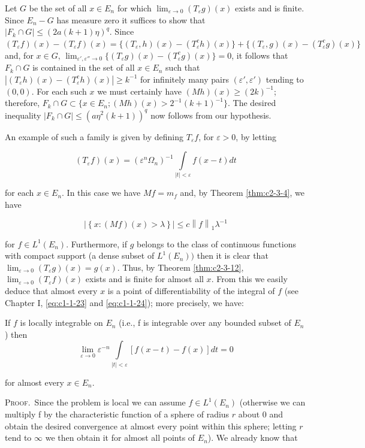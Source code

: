 Let $G$ be the set of all $x \in E_n$ for which $\lim_{\varepsilon \to 0} (T_\varepsilon g)(x)$ exists and is finite. Since $E_n - G$ has measure zero it suffices to show that $|F_k \cap G| \leq (2a(k + 1)\eta)^q$. Since $(T_\varepsilon f)(x) - (T_\varepsilon f)(x) = \{(T_\varepsilon, h)(x) - (T_\varepsilon^c h)(x)\} + \{(T_\varepsilon, g)(x) - (T_\varepsilon^c g)(x)\}$ and, for $x \in G$, $\lim_{\varepsilon', \varepsilon'' \to 0} \{(T_\varepsilon g)(x) - (T_\varepsilon^c g)(x)\} = 0$, it follows that $F_k \cap G$ is contained in the set of all $x \in E_n$ such that $|(T_\varepsilon h)(x) - (T_\varepsilon^c h)(x)| \geq k^{-1}$ for infinitely many pairs $(\varepsilon', \varepsilon')$ tending to $(0, 0)$. For each such $x$ we must certainly have $(Mh)(x) \geq (2k)^{-1}$; therefore, $F_k \cap G \subset \{x \in E_n; (Mh)(x) > 2^{-1}(k + 1)^{-1}\}$. The desired inequality $|F_k \cap G| \leq (a\eta^2(k + 1))^q$ now follows from our hypothesis.

An example of such a family is given by defining $T_{\varepsilon}f$, for $\varepsilon>0$, by letting

\[
(T_{\varepsilon}f)(x)=(\varepsilon^{n}\Omega_{n})^{-1}\int\limits_{|t|<\varepsilon}f(x-t)d t
\]

for each $x \in E_n$. In this case we have $Mf = m_f$ and, by Theorem \ref{thm:c2-3-4}, we have

\[
\left|\left\{x:\left(M f\right)(x)>\lambda\right\}\right|\leq c\left\|f\right\|_{1}\lambda^{-1}
\]

for $f\in L^{1}(E_{n})$. Furthermore, if $g$ belongs to the class of continuous functions with compact support (a dense subset of $L^{1}(E_{n}))$ then it is clear that $\lim_{\varepsilon\to0}(T_{\varepsilon}g)(x)=g(x)$. Thus, by Theorem \ref{thm:c2-3-12}, $\lim_{\varepsilon\to0}(T_{\varepsilon}f)(x)$ exists and is finite for almost all $x$. From this we easily deduce that almost every $x$ is a point of differentiability of the integral of $f$ (see Chapter I, \eqref{eq:c1-1-23} and \eqref{eq:c1-1-24}); more precisely, we have:

\begin{corollary}
\label{cor:c2-3-14}
If $f$ is locally integrable on $E_{n}$ (i.e., f is integrable over any bounded subset of $E_{n}$) then
\[
\lim_{\varepsilon\to0}\varepsilon^{-n}\int\limits_{|t|<\varepsilon}\left[f(x-t)-f(x)\right]d t=0
\]

for almost every $x \in E_n$.
\end{corollary}

\textsc{Proof.}\ Since the problem is local we can assume $f \in L^1(E_n)$ (otherwise we can multiply f by the characteristic function of a sphere of radius $r$ about 0 and obtain the desired convergence at almost every point within this sphere; letting $r$ tend to $\infty$ we then obtain it for almost all points of $E_n$). We already know that

